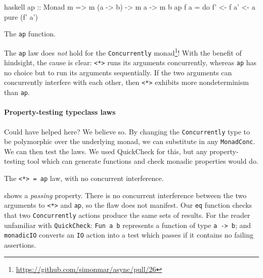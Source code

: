 \begin{listing}
\centering
\begin{cminted}{haskell}
ap :: Monad m => m (a -> b) -> m a -> m b
ap f a = do
  f' <- f
  a' <- a
  pure (f' a')
\end{cminted}
\caption{The \texttt{ap} function.}\label{lst:ap}
\end{listing}

The \verb|ap| law does \emph{not} hold for the \verb|Concurrently|
monad\footnote{\url{https://github.com/simonmar/async/pull/26}}!  With
the benefit of hindsight, the cause is clear: \verb|<*>| runs its
arguments concurrently, whereas \verb|ap| has no choice but to run its
arguments sequentially.  If the two arguments can concurrently
interfere with each other, then \verb|<*>| exhibits more
nondeterminism than \verb|ap|.

\paragraph{Property-testing typeclass laws}
Could \dejafu{} have helped here?  We believe so.  By changing the
\verb|Concurrently| type to be polymorphic over the underlying monad,
we can substitute in any \verb|MonadConc|.  We can then test the laws.
We used QuickCheck\cite{claessen2000} for this, but any
property-testing tool which can generate functions and check monadic
properties would do.

\begin{listing}
\centering
{}
\caption{The \texttt{<*> = ap} law, with no concurrent interference.}\label{lst:aplaw1}
\end{listing}

 shows a \emph{passing} property.  There is no
concurrent interference between the two arguments to \verb|<*>| and
\verb|ap|, so the flaw does not manifest.  Our \verb|eq| function
checks that two \verb|Concurrently| actions produce the same sets of
results.  For the reader unfamiliar with \verb|QuickCheck|:
\verb|Fun a b| represents a function of type \verb|a -> b|; and
\verb|monadicIO| converts an \verb|IO| action into a test which passes
if it contains no failing assertions.

